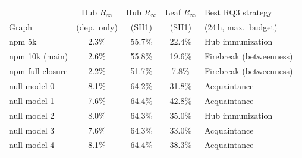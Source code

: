 \begin{tabular}{lcccl}
\toprule
 & Hub $R_\infty$ & Hub $R_\infty$ & Leaf $R_\infty$ & Best RQ3 strategy \\
Graph & (dep.\ only) & (SH1) & (SH1) & (24\,h, max.\ budget) \\
\midrule
npm 5k & 2.3\% & 55.7\% & 22.4\% & Hub immunization \\
npm 10k (main) & 2.6\% & 55.8\% & 19.6\% & Firebreak (betweenness) \\
npm full closure & 2.2\% & 51.7\% & 7.8\% & Firebreak (betweenness) \\
null model 0 & 8.1\% & 64.2\% & 31.8\% & Acquaintance \\
null model 1 & 7.6\% & 64.4\% & 42.8\% & Acquaintance \\
null model 2 & 8.0\% & 64.3\% & 35.0\% & Hub immunization \\
null model 3 & 7.6\% & 64.3\% & 33.0\% & Acquaintance \\
null model 4 & 8.1\% & 64.4\% & 38.3\% & Acquaintance \\
\bottomrule
\end{tabular}
